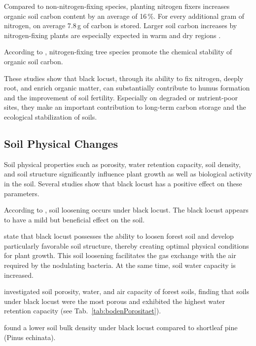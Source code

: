 Compared to non-nitrogen-fixing species, planting nitrogen fixers increases organic soil carbon content by an average of 16\,\%. For every additional gram of nitrogen, on average 7.8\,g of carbon is stored. Larger soil carbon increases by nitrogen-fixing plants are especially expected in warm and dry regions \citep{sun2025nFixiUndC}.

According to \citet{ye2024nFixCstab}, nitrogen-fixing tree species promote the chemical stability of organic soil carbon.

These studies show that black locust, through its ability to fix nitrogen, deeply root, and enrich organic matter, can substantially contribute to humus formation and the improvement of soil fertility. Especially on degraded or nutrient-poor sites, they make an important contribution to long-term carbon storage and the ecological stabilization of soils.


\subsection{Soil Physical Changes}

Soil physical properties such as porosity, water retention capacity, soil density, and soil structure significantly influence plant growth as well as biological activity in the soil. Several studies show that black locust has a positive effect on these parameters.

According to \citet[pp.~474, 483]{ramann1898influssBodendeckeAufPhysikalischeBodeneigenschaften}, soil loosening occurs under black locust. The black locust appears to have a mild but beneficial effect on the soil.

\citet{albert1926robinieBodenlockerheit,penschuck1931robinieBodenphysik} state that black locust possesses the ability to loosen forest soil and develop particularly favorable soil structure, thereby creating optimal physical conditions for plant growth. This soil loosening facilitates the gas exchange with the air required by the nodulating bacteria. At the same time, soil water capacity is increased.

\citet{nemec1925waldboden} investigated soil porosity, water, and air capacity of forest soils, finding that soils under black locust were the most porous and exhibited the highest water retention capacity (see Tab.~\ref{tab:bodenPorositaet}).


\citet{ashby1986robinieWuchssteigerung} found a lower soil bulk density under black locust compared to shortleaf pine (Pinus echinata).


